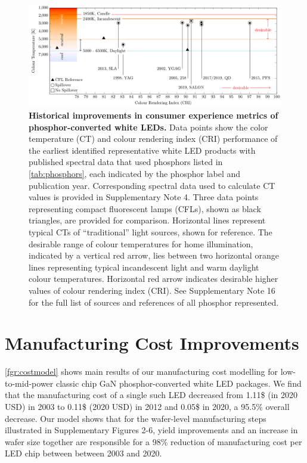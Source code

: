 \documentclass[parskip=full]{article}
\begin{document}
\begin{figure}[H]
 \centering
 \includegraphics[width=\textwidth]{figures/breakthroughs_consumer-experience.pdf}
 \caption{\textbf{Historical improvements in consumer experience metrics of phosphor-converted white LEDs.} Data points show the color temperature (CT) and colour rendering index (CRI) performance of the earliest identified representative white LED products with published spectral data that used phosphors listed in \cref{tab:phosphors}, each indicated by the phosphor label and publication year. Corresponding spectral data used to calculate CT values is provided in Supplementary Note 4. Three data points representing compact fluorescent lamps (CFLs)\cite{cie_reference}, shown as black triangles, are provided for comparison. Horizontal lines represent typical CTs of “traditional” light sources, shown for reference. The desirable range of colour temperatures for home illumination, indicated by a vertical red arrow, lies between two horizontal orange lines representing typical incandescent light and warm daylight colour temperatures. Horizontal red arrow indicates desirable higher values of colour rendering index (CRI). See Supplementary Note 16 for the full list of sources and references of all phosphor represented.}
 \label{fgr:consumer_experience}
\end{figure}

\section{Manufacturing Cost Improvements}

\cref{fgr:costmodel} shows main results of our manufacturing cost modelling for low-to-mid-power classic chip GaN phosphor-converted white LED packages. We find that the manufacturing cost of a single such LED decreased from 1.11\$ (in 2020 USD) in 2003 to 0.11\$ (2020 USD) in 2012 and 0.05\$ in 2020, a 95.5\% overall decrease. Our model shows that for the wafer-level manufacturing steps illustrated in Supplementary Figures 2-6, yield improvements and an increase in  wafer size together are responsible for a 98\% reduction of manufacturing cost per LED chip between between 2003 and 2020.
\end{document}

